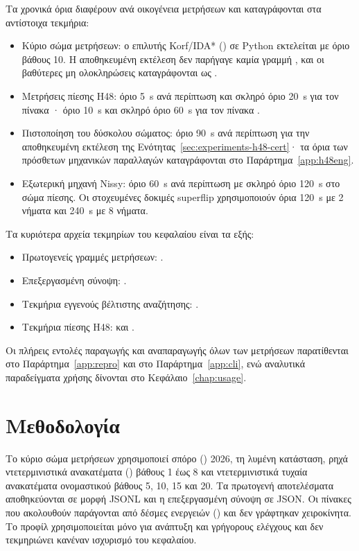 Τα χρονικά όρια διαφέρουν ανά οικογένεια μετρήσεων και καταγράφονται στα αντίστοιχα τεκμήρια:
\begin{itemize}
  \item Κύριο σώμα μετρήσεων: ο επιλυτής Korf/IDA* () σε Python εκτελείται με όριο βάθους 10. Η αποθηκευμένη εκτέλεση δεν παρήγαγε καμία γραμμή , και οι βαθύτερες μη ολοκληρώσεις καταγράφονται ως .
  \item Μετρήσεις πίεσης H48: όριο 5~s ανά περίπτωση και σκληρό όριο 20~s για τον πίνακα · όριο 10~s και σκληρό όριο 60~s για τον πίνακα .
  \item Πιστοποίηση του δύσκολου σώματος: όριο 90~s ανά περίπτωση για την αποθηκευμένη εκτέλεση της Ενότητας~\ref{sec:experiments-h48-cert}· τα όρια των πρόσθετων μηχανικών παραλλαγών καταγράφονται στο Παράρτημα~\ref{app:h48eng}.
  \item Εξωτερική μηχανή Nissy: όριο 60~s ανά περίπτωση με σκληρό όριο 120~s στο σώμα πίεσης. Οι στοχευμένες δοκιμές superflip χρησιμοποιούν όρια 120~s με 2 νήματα και 240~s με 8 νήματα.
\end{itemize}

Τα κυριότερα αρχεία τεκμηρίων του κεφαλαίου είναι τα εξής:
\begin{itemize}
  \item Πρωτογενείς γραμμές μετρήσεων: .
  \item Επεξεργασμένη σύνοψη: .
  \item Τεκμήρια εγγενούς βέλτιστης αναζήτησης: .
  \item Τεκμήρια πίεσης H48:  και .
\end{itemize}
Οι πλήρεις εντολές παραγωγής και αναπαραγωγής όλων των μετρήσεων παρατίθενται στο Παράρτημα~\ref{app:repro} και στο Παράρτημα~\ref{app:cli}, ενώ αναλυτικά παραδείγματα χρήσης δίνονται στο Κεφάλαιο~\ref{chap:usage}.

\section{Μεθοδολογία}
\label{sec:experiments-methodology}

Το κύριο σώμα μετρήσεων χρησιμοποιεί σπόρο () 2026, τη λυμένη κατάσταση, ρηχά ντετερμινιστικά ανακατέματα () βάθους 1 έως 8 και ντετερμινιστικά τυχαία ανακατέματα ονομαστικού βάθους 5, 10, 15 και 20. Τα πρωτογενή αποτελέσματα αποθηκεύονται σε μορφή JSONL και η επεξεργασμένη σύνοψη σε JSON. Οι πίνακες που ακολουθούν παράγονται από δέσμες ενεργειών () και δεν γράφτηκαν χειροκίνητα. Το προφίλ  χρησιμοποιείται μόνο για ανάπτυξη και γρήγορους ελέγχους και δεν τεκμηριώνει κανέναν ισχυρισμό του κεφαλαίου.


